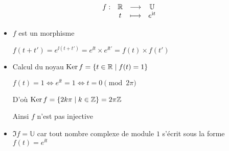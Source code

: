 \begin{frame}
\begin{exemple}
$$
\begin{array}{lccc}
f : & \mathbb{R} & \longrightarrow & \mathbb{U}  \\
    & t   & \longmapsto  & e^{\mathrm{i} t} \\
\end{array}
$$
\pause
\begin{itemize}
  \item $f$ est un morphisme

 $f(t+t')=e^{\ii (t+t')}= e^{\ii t} \times e^{\ii t'} = f(t)\times f(t')$

\pause

  \item Calcul du noyau $\mathop{\text{Ker}}\nolimits f = \{ t \in \mathbb{R} \mid f(t)=1 \}$

 $f(t)=1 \iff  e^{\ii t}= 1 \iff t= 0 \pmod{2\pi}$

D'où $\mathop{\text{Ker}}\nolimits f = \{ 2k\pi \mid k \in \mathbb{Z}\} = 2\pi \mathbb{Z}$

\pause

 Ainsi $f$ n'est pas injective

\pause
  \item $\Im f = \mathbb{U}$ car tout nombre complexe de module $1$ 
s'écrit sous la forme $f(t)=e^{\ii t}$
\end{itemize}
\end{exemple}

% 
% 
% 
% 
% 
% 
\end{frame}

